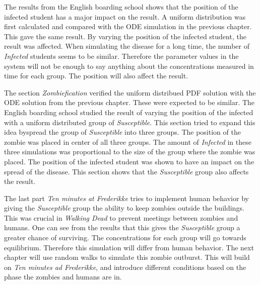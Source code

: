 \documentclass[%
twoside,                 %
final,                   %
chapterprefix=true,      %
open=right               %
10pt]{book}
\begin{document}
\vspace{3mm}




\vspace{3mm}


The results from the English boarding school shows that the position of the infected student has a major impact on the result. A uniform distribution was first calculated and compared with the ODE simulation in the previous chapter. This gave the same result. By varying the position of the infected student, the result was affected. When simulating the disease for a long time, the number of \emph{Infected} students seems to be similar. Therefore the parameter values in the system will not be enough to say anything about the concentrations measured in time for each group. The position will also affect the result. 


\vspace{3mm}




\vspace{3mm}


The section \emph{Zombiefication} verified the uniform distribued PDF solution with the ODE solution from the previous chapter. These were expected to be similar. The English boarding school studied the result of varying the position of the infected with a uniform distributed group of \emph{Susceptible}. This section tried to expand this idea byspread the group of \emph{Susceptible} into three groups. The position of the zombie was placed in center of all three groups. The amount of \emph{Infected} in these three simulations was proportional to the size of the group where the zombie was placed. The position of the infected student was shown to have an impact on the spread of the disease. This section shows that the \emph{Susceptible} group also affects the result.


\vspace{3mm}




\vspace{3mm}


The last part \emph{Ten minutes at Frederikke} tries to implement human behavior by giving the \emph{Susceptible} group the ability to keep zombies outside the buildings. This was crucial in \emph{Walking Dead} to prevent meetings between zombies and humans. One can see from the results that this gives the \emph{Susceptible} group a greater chance of surviving. The concentrations for each group will go towards equilibrium. Therefore this simulation will differ from human behavior. The next chapter will use random walks to simulate this zombie outburst. This will build on \emph{Ten minutes ad Frederikke}, and introduce different conditions based on the phase the zombies and humans are in. 
\end{document}
